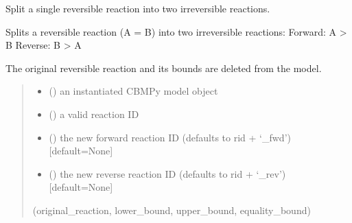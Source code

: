 \documentclass[letterpaper,12pt,english]{sphinxmanual}
\begin{document}
\begin{fulllineitems}
\label{\detokenize{api/core:cbmpy.CBTools.splitSingleReversibleReaction}}
\pysigstartsignatures
\pysiglinewithargsret
{}
{\sphinxparamcomma {}\sphinxparamcomma {}\sphinxparamcomma {}}
{}
\pysigstopsignatures
\sphinxAtStartPar
Split a single reversible reaction into two irreversible reactions.

\sphinxAtStartPar
Splits a reversible reaction (A = B) into two irreversible reactions:
\sphinxhyphen{} Forward: A \sphinxhyphen{}\textgreater{} B
\sphinxhyphen{} Reverse: B \sphinxhyphen{}\textgreater{} A

\sphinxAtStartPar
The original reversible reaction and its bounds are deleted from the model.
\begin{quote}\begin{description}
\begin{itemize}
\item {} 
\sphinxAtStartPar
{} () \textendash{} an instantiated CBMPy model object

\item {} 
\sphinxAtStartPar
{} () \textendash{} a valid reaction ID

\item {} 
\sphinxAtStartPar
{} (\sphinxstyleliteralemphasis{\sphinxupquote{, }}) \textendash{} the new forward reaction ID (defaults to rid + ‘\_fwd’) {[}default=None{]}

\item {} 
\sphinxAtStartPar
{} (\sphinxstyleliteralemphasis{\sphinxupquote{, }}) \textendash{} the new reverse reaction ID (defaults to rid + ‘\_rev’) {[}default=None{]}

\end{itemize}

\sphinxAtStartPar
{} \textendash{} (original\_reaction, lower\_bound, upper\_bound, equality\_bound)

\end{description}\end{quote}

\end{fulllineitems}
\end{document}
